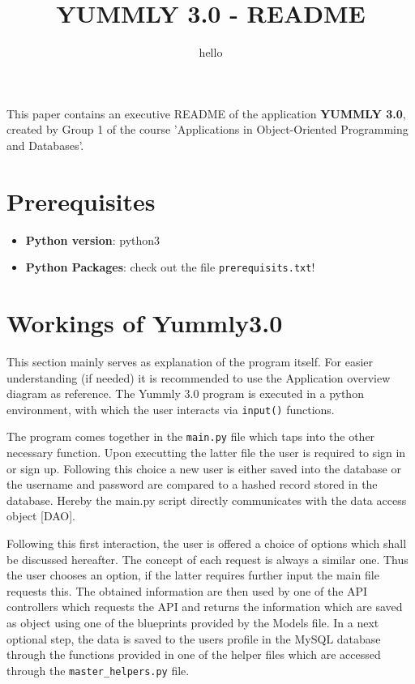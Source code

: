 \documentclass[11pt,a4paper,notitlepage]{article}
\title{YUMMLY 3.0 -  README}
\subtitle{hello}
\date{\vspace{-5ex}}
\author{\vspace{-5ex}}
\begin{document}
\maketitle
\thispagestyle{fancy}

This paper contains an executive README of the application \textbf{ YUMMLY 3.0}, created by Group 1 of the course 'Applications in Object-Oriented Programming and Databases'.

\section*{Prerequisites}
\begin{itemize}  
\item\textbf{Python version}: python3
\item \textbf{Python Packages}: check out the file \texttt{prerequisits.txt}!
\end{itemize}
 
\section*{Workings of Yummly3.0}
This section mainly serves as explanation of the program itself. For easier understanding (if needed) it is recommended to use the Application overview diagram as reference. The Yummly 3.0 program is executed in a python environment, with which the user interacts via \texttt{input()} functions.

The program comes together in the \texttt{main.py} file which taps into the other necessary function.
Upon executting the latter file the user is required to sign in or sign up.
Following this choice a new user is either saved into the database or the username and password are compared to a hashed record stored in the database.
Hereby the main.py script directly communicates with the data access object [DAO].

Following this first interaction, the user is offered a choice of options which shall be discussed hereafter. The concept of each request is always a similar one.
Thus the user chooses an option, if the latter requires further input the main file requests this. The obtained information are then used by one of the API controllers which requests the API and returns the information which are saved as object using one of the blueprints provided by the Models file.
In a next optional step, the data is saved to the users profile in the MySQL database through the functions provided in one of the helper files which are accessed through the \texttt{master\_helpers.py} file.
\end{document}
